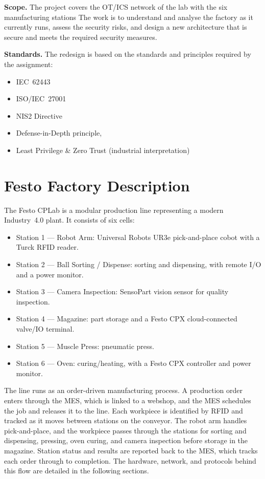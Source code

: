 \documentclass[11pt,a4paper]{article}
\begin{document}
\vspace{1em}
\textbf{Scope.} The project covers the OT/ICS network of the
lab with the six manufacturing stations The work is to understand and
analyse the factory as it currently runs, assess the
security risks, and design a new architecture that is secure
and meets the required security measures.
\vspace{1em}

\textbf{Standards.} The redesign is based on the standards
and principles required by the assignment: 
\begin{itemize}
    \item IEC~62443
    \item ISO/IEC~27001
    \item NIS2 Directive
    \item Defense-in-Depth principle, 
    \item Least Privilege \& Zero Trust (industrial interpretation)
\end{itemize}

\pagebreak

\section{Festo Factory Description}
The Festo CPLab is a modular production line representing a
modern Industry~4.0 plant. It consists of six cells:
\vspace{0.5em} 
\begin{itemize}[nosep]
  \item Station 1 --- Robot Arm: Universal Robots UR3e pick-and-place cobot with a Turck RFID reader.
  \item Station 2 --- Ball Sorting / Dispense: sorting and dispensing, with remote I/O and a power monitor.
  \item Station 3 --- Camera Inspection: SensoPart vision sensor for quality inspection.
  \item Station 4 --- Magazine: part storage and a Festo CPX cloud-connected valve/IO terminal.
  \item Station 5 --- Muscle Press: pneumatic press.
  \item Station 6 --- Oven: curing/heating, with a Festo CPX controller and power monitor.
\end{itemize}

\vspace{0.5em}
The line runs as an order-driven manufacturing process. A production order
enters through the MES, which is linked to a webshop, and the MES schedules the
job and releases it to the line. Each workpiece is identified by RFID and
tracked as it moves between stations on the conveyor. The robot arm handles
pick-and-place, and the workpiece passes through the stations for sorting and
dispensing, pressing, oven curing, and camera inspection before storage in the
magazine. Station status and results are reported back to the MES, which tracks
each order through to completion. The hardware, network, and protocols behind
this flow are detailed in the following sections.
\end{document}
